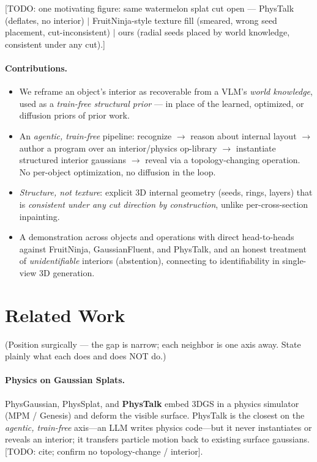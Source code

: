 \documentclass[10pt,twocolumn,letterpaper]{article}
\newcommand{\todo}[1]{{\color{red}\small[TODO: #1]}}
\newcommand{\note}[1]{{\color{teal}\small(#1)}}
\begin{document}
\todo{one motivating figure: same watermelon splat cut open ---
PhysTalk (deflates, no interior) $\mid$ FruitNinja-style texture fill
(smeared, wrong seed placement, cut-inconsistent) $\mid$ ours (radial
seeds placed by world knowledge, consistent under any cut).}

\paragraph{Contributions.}
\begin{itemize}\itemsep0.1em
  \item We reframe an object's interior as recoverable from a VLM's
    \emph{world knowledge}, used as a \emph{train-free structural prior}
    --- in place of the learned, optimized, or diffusion priors of prior
    work.
  \item An \emph{agentic, train-free} pipeline: recognize $\rightarrow$
    reason about internal layout $\rightarrow$ author a program over an
    interior/physics op-library $\rightarrow$ instantiate structured
    interior gaussians $\rightarrow$ reveal via a topology-changing
    operation. No per-object optimization, no diffusion in the loop.
  \item \emph{Structure, not texture}: explicit 3D internal geometry
    (seeds, rings, layers) that is \emph{consistent under any cut
    direction by construction}, unlike per-cross-section inpainting.
  \item A demonstration across objects and operations with direct
    head-to-heads against FruitNinja, GaussianFluent, and PhysTalk, and
    an honest treatment of \emph{unidentifiable} interiors (abstention),
    connecting to identifiability in single-view 3D generation.
\end{itemize}

\section{Related Work}
\label{sec:related}
\note{Position surgically --- the gap is narrow; each neighbor is one
axis away. State plainly what each does and does NOT do.}

\paragraph{Physics on Gaussian Splats.} PhysGaussian, PhysSplat, and
\textbf{PhysTalk} embed 3DGS in a physics simulator (MPM / Genesis) and
deform the visible surface. PhysTalk is the closest on the
\emph{agentic, train-free} axis---an LLM writes physics code---but it
never instantiates or reveals an interior; it transfers particle motion
back to existing surface gaussians. \todo{cite; confirm no
topology-change / interior}.
\end{document}
